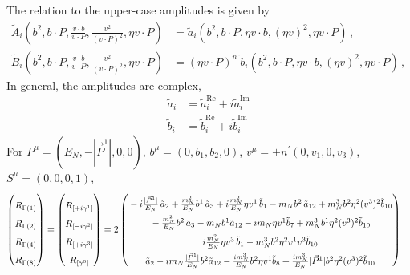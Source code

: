 \documentclass[]{article}
\numberwithin{equation}{section}
\newcommand{\tcdot}{{\cdot}}
\newcommand{\tAmp}{\widetilde{A}}
\newcommand{\tBmp}{\widetilde{B}}
\newcommand{\tAmp}{\ensuremath{\widetilde{A}^{(+)}}}
\newcommand{\tBmp}{\ensuremath{\widetilde{B}^{(+)}}}
\newcommand{\bvec}{b}
\newcommand{\mN}{m_N}
\begin{document}
The relation to the upper-case amplitudes is given by
\begin{align}
	\tAmp_i\left(\bvec^2,\bvec \tcdot P,\frac{v \tcdot \bvec}{v \tcdot P}, \frac{v^2}{(v \tcdot P)^2}, \eta v \tcdot P\right) & = \tilde a_i(\bvec^2,\bvec \tcdot P, \eta v \tcdot b, (\eta v)^2, \eta v \tcdot P)    \, , \nonumber \\
	 \tBmp_i\left(\bvec^2,\bvec \tcdot P,\frac{v \tcdot \bvec}{v \tcdot P}, \frac{v^2}{(v \tcdot P)^2}, \eta v \tcdot P\right) & = (\eta v \tcdot P)^n\ \tilde b_i(\bvec^2,\bvec \tcdot P, \eta v \tcdot b, (\eta v)^2, \eta v \tcdot P)   \, ,
	\label{eq-ab}
\end{align}
In general, the amplitudes are complex,
\begin{align}
    \tilde{a}_i&=\tilde{a}^{\text{Re}}_i+i\tilde{a}^{\text{Im}}_i\\
    \tilde{b}_i&=\tilde{b}^{\text{Re}}_i+i\tilde{b}^{\text{Im}}_i
\end{align}
For $P^{\mu}=(E_N, -|\vec{P}^1|,0,0)$, $b^{\mu}=(0,b_{1},b_{2},0)$, $v^{\mu}=\pm n^{\prime}(0,v_{1},0,v_{3})$, $S^{\mu}=(0,0,0,1)$,
\begin{align}
    \begin{pmatrix}
        \rule{0pt}{16pt} R_{\Gamma(1)}\\
        \rule{0pt}{16pt} R_{\Gamma(2)}\\
        \rule{0pt}{16pt} R_{\Gamma(4)}\\
        \rule{0pt}{16pt} R_{\Gamma(8)}
    \end{pmatrix} = \begin{pmatrix}
        \rule{0pt}{16pt} R_{[+i\gamma^1]}\\
        \rule{0pt}{16pt} R_{[-i\gamma^2]}\\
        \rule{0pt}{16pt} R_{[+i\gamma^3]}\\
        \rule{0pt}{16pt} R_{[\gamma^0]}
    \end{pmatrix} &=2\begin{pmatrix}
        \rule{0pt}{16pt} -i\frac{|\vec{P}^1|}{E_N}\, \tilde a_2+  \frac{\mN^2}{E_N} \bvec^1\, \tilde a_3+ i\frac{\mN^2}{E_N} \eta v^1\, \tilde b_1 
		-  \mN  \bvec^2 \, \tilde a_{12}+  \mN^3  \bvec^2 \eta^2 (v^3)^2 \tilde b_{10}\\
         \rule{0pt}{16pt} -  \frac{\mN^2}{E_N} \bvec^2\, \tilde a_3
		-  \mN   \bvec^1  \tilde a_{12}-i \mN \eta  v^1  \tilde b_7+ \mN^3  \bvec^1 \eta^2 (v^3)^2 \tilde b_{10}\\
        \rule{0pt}{16pt} i\frac{\mN^2}{E_N} \eta v^3\, \tilde b_1-  \mN^3 \bvec^2 \eta^2 v^1 v^3\tilde b_{10}\\
         \rule{0pt}{16pt}   \tilde a_2  - i \mN  \frac{|\vec{P}^1|}{E_N} \bvec^2  \tilde a_{12}- \frac{ i \mN^3}{E_N}  \bvec^2 \eta v^1  \tilde b_8+ \frac{i \mN^3}{E_N}  |\vec{P}^1| \bvec^2 \eta^2 (v^3)^2 \tilde b_{10}
    \end{pmatrix}
\end{align}
\end{document}
